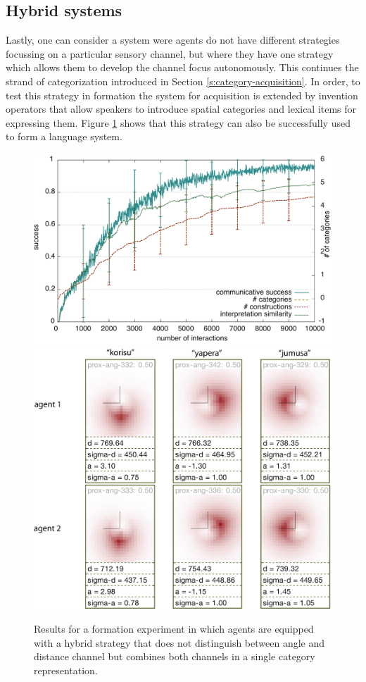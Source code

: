 \subsection{Hybrid systems}
Lastly, one can consider a system were agents do not have different strategies 
focussing on a particular sensory channel, but where they have one strategy 
which allows them to develop the channel focus autonomously. 
This continues the strand of categorization introduced in
Section \ref{s:category-acquisition}. In order, to test this strategy in formation
the system for acquisition is extended by invention operators that allow
speakers to introduce spatial categories and lexical items for expressing them.
Figure \ref{f:proximal-angular+results} shows that this strategy can also be
successfully used to form a language system.
\begin{figure}
\begin{center}
\includegraphics[width=0.9\columnwidth]{figs/category-formation-proximal-angular-results+categories-1}
\includegraphics[width=0.8\columnwidth]{figs/category-formation-proximal-angular-results+categories-2.png}
\end{center}
\caption[Results formation of hybrid systems]{Results for a formation 
experiment in which agents are equipped with a hybrid
strategy that does not distinguish between angle and distance 
channel but combines both channels in a single 
category representation.}
\label{f:proximal-angular+results}
\end{figure}

